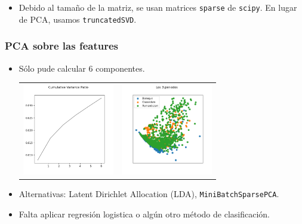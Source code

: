 \documentclass{beamer}
\theoremstyle{plain}
\numberwithin{equation}{section} %
\numberwithin{figure}{section} %
\numberwithin{table}{section} %
\begin{document}
{\begin{frame}
\begin{itemize}
\item Debido al tama\~no de la matriz, se usan matrices \texttt{sparse} de \texttt{scipy}. En lugar de PCA, usamos \texttt{truncatedSVD}.
\medskip

\end{itemize}

\end{frame}


\begin{frame}
\frametitle{PCA sobre las features}


\begin{itemize}
\justifying
\item S\'olo pude calcular 6 componentes.


\begin{table}[h!]
\begin{center}
\begin{tabular}{cc}

\begin{minipage}{.4\textwidth}
\includegraphics[width=\linewidth, height=40mm]{PCA-6D.png}
\end{minipage}

 &
\begin{minipage}{.4\textwidth}
\includegraphics[width=\linewidth, height=40mm]{PCA.png}
\end{minipage}
\\
\end{tabular}
\end{center}
\end{table}

\item Alternativas: Latent Dirichlet Allocation (LDA), \texttt{MiniBatchSparsePCA}.

\item Falta aplicar regresi\'on logistica o alg\'un otro m\'etodo de clasificaci\'on.

\end{itemize}

\end{frame}
}
\end{document}
